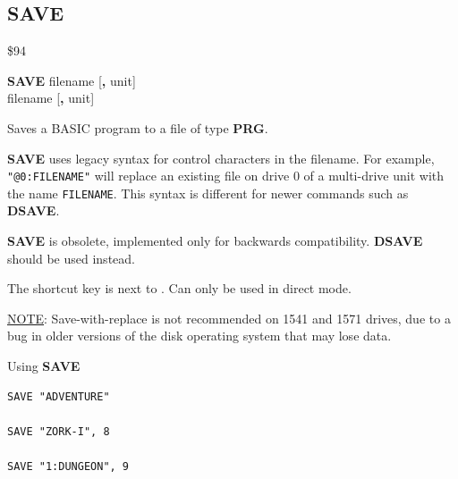 \subsection{SAVE}
\begin{description}[leftmargin=2cm,style=nextline]
\item [Token:]    \$94

\item [Format:]   {\bf SAVE} filename [{\bf,} unit] \\
                  \megakeywhite{$\leftarrow$} filename [{\bf,} unit]

\item [Usage:]    Saves a BASIC program to a file of type {\bf PRG}.

                  \filenamedefinition

                  {\bf SAVE} uses legacy syntax for control characters in the filename. For example, \texttt{"@0:FILENAME"} will replace an existing file on drive 0 of a multi-drive unit with the name \texttt{FILENAME}. This syntax is different for newer commands such as {\bf DSAVE}.

                  \unitdefinition

\item [Remarks:]  {\bf SAVE} is obsolete, implemented only for backwards compatibility. {\bf DSAVE} should be used instead.

                  The shortcut key \megakeywhite{$\leftarrow$} is next to . Can only be used in direct mode.

                  \underline{NOTE}: Save-with-replace is not recommended on 1541 and 1571 drives, due to a bug in older versions of the disk operating system that may lose data.

\item [Examples:] Using {\bf SAVE}

\begin{tcolorbox}[colback=black,coltext=white]
\verbatimfont{\codefont}
\begin{verbatim}
SAVE "ADVENTURE"

SAVE "ZORK-I", 8

SAVE "1:DUNGEON", 9
\end{verbatim}
\end{tcolorbox}
\end{description}


\newpage
